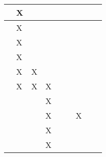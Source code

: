 \begin{longtable}{|l|llllllll|}
    \cite[]{Ningombam.2022}       & \multicolumn{1}{l|}{X}   & \multicolumn{1}{l|}{}     & \multicolumn{1}{l|}{}   & \multicolumn{1}{l|}{}   & \multicolumn{1}{l|}{}   & \multicolumn{1}{l|}{}   & \multicolumn{1}{l|}{}     &    \\ \hline
    \cite[]{Arulkumaran.2017}     & \multicolumn{1}{l|}{X}   & \multicolumn{1}{l|}{}     & \multicolumn{1}{l|}{}   & \multicolumn{1}{l|}{}   & \multicolumn{1}{l|}{}   & \multicolumn{1}{l|}{}   & \multicolumn{1}{l|}{}     &    \\ \hline
    \cite[]{Huang.2017}           & \multicolumn{1}{l|}{X}   & \multicolumn{1}{l|}{}     & \multicolumn{1}{l|}{}   & \multicolumn{1}{l|}{}   & \multicolumn{1}{l|}{}   & \multicolumn{1}{l|}{}   & \multicolumn{1}{l|}{}     &    \\ \hline
    \cite[]{Mnih.2013}            & \multicolumn{1}{l|}{X}   & \multicolumn{1}{l|}{}     & \multicolumn{1}{l|}{}   & \multicolumn{1}{l|}{}   & \multicolumn{1}{l|}{}   & \multicolumn{1}{l|}{}   & \multicolumn{1}{l|}{}     &    \\ \hline
    \cite[]{Wong.2022}            & \multicolumn{1}{l|}{X}   & \multicolumn{1}{l|}{X}    & \multicolumn{1}{l|}{}   & \multicolumn{1}{l|}{}   & \multicolumn{1}{l|}{}   & \multicolumn{1}{l|}{}   & \multicolumn{1}{l|}{}     &    \\ \hline
    \cite[]{Schuderer.2021}       & \multicolumn{1}{l|}{X}   & \multicolumn{1}{l|}{X}    & \multicolumn{1}{l|}{X}   & \multicolumn{1}{l|}{}   & \multicolumn{1}{l|}{}   & \multicolumn{1}{l|}{}   & \multicolumn{1}{l|}{}     &    \\ \hline
    \cite[]{Korber.2021}          & \multicolumn{1}{l|}{}   & \multicolumn{1}{l|}{}    & \multicolumn{1}{l|}{X}   & \multicolumn{1}{l|}{}   & \multicolumn{1}{l|}{}   & \multicolumn{1}{l|}{}   & \multicolumn{1}{l|}{}     &    \\ \hline
    \cite[]{Bharadhwaj.2019}      & \multicolumn{1}{l|}{}   & \multicolumn{1}{l|}{}    & \multicolumn{1}{l|}{X}   & \multicolumn{1}{l|}{}   & \multicolumn{1}{l|}{}   & \multicolumn{1}{l|}{X}   & \multicolumn{1}{l|}{}     &    \\ \hline
    \cite[]{Foronda.2021}         & \multicolumn{1}{l|}{}   & \multicolumn{1}{l|}{}    & \multicolumn{1}{l|}{X}   & \multicolumn{1}{l|}{}   & \multicolumn{1}{l|}{}   & \multicolumn{1}{l|}{}   & \multicolumn{1}{l|}{}     &    \\ \hline
    \cite[]{Maria.1997}           & \multicolumn{1}{l|}{}   & \multicolumn{1}{l|}{}    & \multicolumn{1}{l|}{X}   & \multicolumn{1}{l|}{}   & \multicolumn{1}{l|}{}   & \multicolumn{1}{l|}{}   & \multicolumn{1}{l|}{}     &    \\ \hline

\end{longtable}
